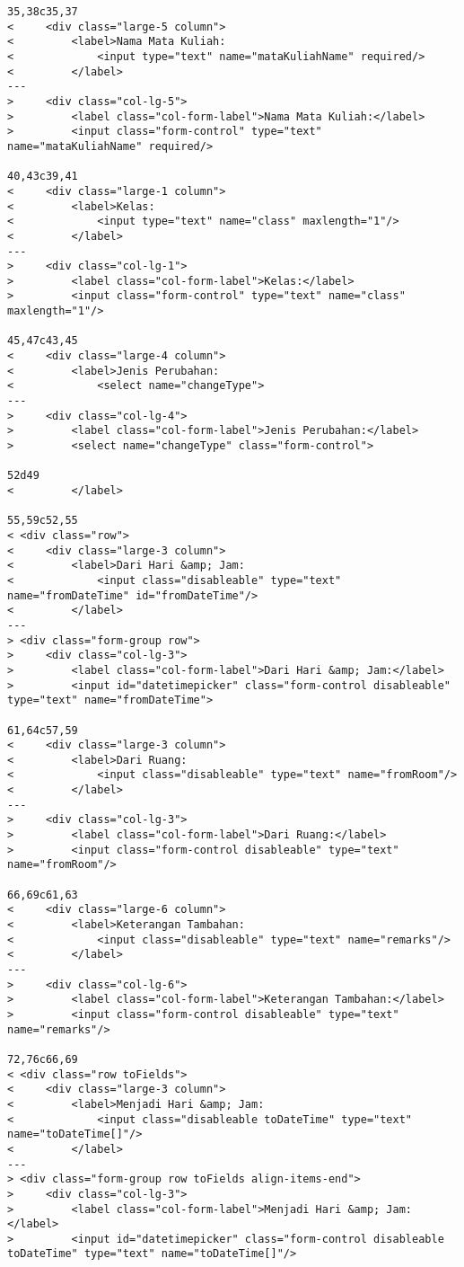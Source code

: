 \begin{lstlisting}
35,38c35,37
<     <div class="large-5 column">
<         <label>Nama Mata Kuliah:
<             <input type="text" name="mataKuliahName" required/>
<         </label>
---
>     <div class="col-lg-5">
>         <label class="col-form-label">Nama Mata Kuliah:</label>
>         <input class="form-control" type="text" name="mataKuliahName" required/>

40,43c39,41
<     <div class="large-1 column">
<         <label>Kelas:
<             <input type="text" name="class" maxlength="1"/>
<         </label>
---
>     <div class="col-lg-1">
>         <label class="col-form-label">Kelas:</label>
>         <input class="form-control" type="text" name="class" maxlength="1"/>

45,47c43,45
<     <div class="large-4 column">
<         <label>Jenis Perubahan:
<             <select name="changeType">
---
>     <div class="col-lg-4">
>         <label class="col-form-label">Jenis Perubahan:</label>
>         <select name="changeType" class="form-control">

52d49
<         </label>

55,59c52,55
< <div class="row">
<     <div class="large-3 column">
<         <label>Dari Hari &amp; Jam:
<             <input class="disableable" type="text" name="fromDateTime" id="fromDateTime"/>
<         </label>
---
> <div class="form-group row">
>     <div class="col-lg-3">
>         <label class="col-form-label">Dari Hari &amp; Jam:</label>
>         <input id="datetimepicker" class="form-control disableable" type="text" name="fromDateTime">

61,64c57,59
<     <div class="large-3 column">
<         <label>Dari Ruang:
<             <input class="disableable" type="text" name="fromRoom"/>
<         </label>
---
>     <div class="col-lg-3">
>         <label class="col-form-label">Dari Ruang:</label>
>         <input class="form-control disableable" type="text" name="fromRoom"/>

66,69c61,63
<     <div class="large-6 column">
<         <label>Keterangan Tambahan:
<             <input class="disableable" type="text" name="remarks"/>
<         </label>
---
>     <div class="col-lg-6">
>         <label class="col-form-label">Keterangan Tambahan:</label>
>         <input class="form-control disableable" type="text" name="remarks"/>

72,76c66,69
< <div class="row toFields">
<     <div class="large-3 column">
<         <label>Menjadi Hari &amp; Jam:
<             <input class="disableable toDateTime" type="text" name="toDateTime[]"/>
<         </label>
---
> <div class="form-group row toFields align-items-end">
>     <div class="col-lg-3">
>         <label class="col-form-label">Menjadi Hari &amp; Jam:</label>
>         <input id="datetimepicker" class="form-control disableable toDateTime" type="text" name="toDateTime[]"/>


\end{lstlisting}
